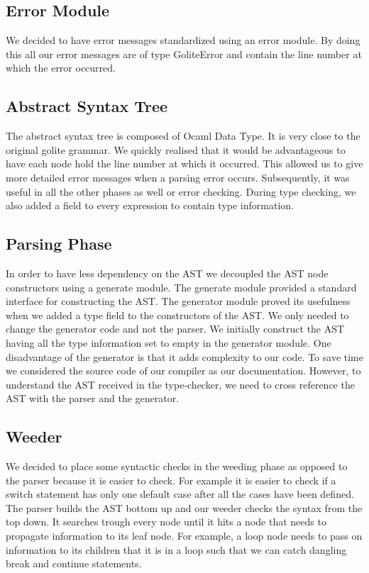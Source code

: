 \documentclass{article}
\begin{document}
\subsection{Error Module}
We decided to have error messages standardized using an error module. By doing this all our error messages are of type GoliteError and contain the line number at which the error occurred.

\subsection{Abstract Syntax Tree}
The abstract syntax tree is composed of Ocaml Data Type. It is very close to the original golite grammar. We quickly realised that it would be advantageous to have each node hold the line number at which it occurred. This allowed us to give more detailed error messages when a parsing error occurs. Subsequently, it was useful in all the other phases as well or error checking. During type checking, we also added a field to every expression to contain type information. 

\subsection{Parsing Phase}
In order to have less dependency on the AST we decoupled the AST node constructors using a generate module. The generate module provided a standard interface for constructing the AST. The generator module proved its usefulness when we added a type field to the constructors of the AST. We only needed to change the generator code and not the parser. We initially construct the AST having all the type information set to empty in the generator module. 
One disadvantage of the generator is that it adds complexity to our code. To save time we considered the source code of our compiler as our documentation. However, to understand the AST received in the type-checker, we need to cross reference the AST with the parser and the generator. 

\subsection{Weeder}
We decided to place some syntactic checks in the weeding phase as opposed to the parser because it is easier to check. For example it is easier to check if  a switch statement has only one default case after all the cases have been defined. The parser builds the AST bottom up and our weeder checks the syntax from the top down. It searches trough every node until it hits a node that needs to propagate information to its leaf node. For example, a loop node needs to pass on information to its children that it is in a loop such that we can catch dangling break and continue statements. 
\end{document}

